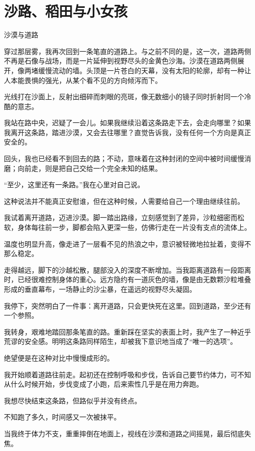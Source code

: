 \chapter{沙路、稻田与小女孩}

沙漠与道路

穿过那层雾，我再次回到一条笔直的道路上。与之前不同的是，这一次，道路两侧不再是石像与战场，而是一片延伸到视野尽头的金黄色沙海。沙漠在道路两侧展开，像两堵缓慢流动的墙。头顶是一片苍白的天幕，没有太阳的轮廓，却有一种让人本能畏惧的强光，从某个看不见的方向倾泻而下。

光线打在沙面上，反射出细碎而刺眼的亮斑，像无数细小的镜子同时折射同一个冷酷的意志。

我站在路中央，迟疑了一会儿。如果我继续沿着这条路走下去，会走向哪里？如果我离开这条路，踏进沙漠，又会去往哪里？直觉告诉我，没有任何一个方向是真正安全的。

回头，我也已经看不到回去的路；不动，意味着在这种封闭的空间中被时间缓慢消磨；向前走，则是把自己交给一个完全未知的结果。

“至少，这里还有一条路。”我在心里对自己说。

这种说法并不能真正安慰谁，但在这种时候，人需要给自己一个理由继续往前。

我试着离开道路，迈进沙漠。脚一踏出路缘，立刻感觉到了差异，沙粒细密而松软，身体每往前一步，脚都会陷入更深一些，仿佛行走在一片没有支点的流体上。

温度也明显升高，像走进了一层看不见的热浪之中，意识被轻微地拉扯着，变得不那么稳定。

走得越远，脚下的沙越松散，腿部没入的深度不断增加。当我距离道路有一段距离时，已经很难控制身体的重心。远方隐约有一道灰色的墙，像是由无数颗沙粒堆叠形成的垂直幕布，一场静止的沙尘暴，在遥远的视野尽头凝固。

我停下，突然明白了一件事：离开道路，只会更快死在这里。回到道路，至少还有一个参照。

我转身，艰难地踏回那条笔直的路。重新踩在坚实的表面上时，我产生了一种近乎荒谬的安全感。明明这条路同样陌生，却被我下意识地当成了“唯一的选项”。

绝望便是在这种对比中慢慢成形的。

我开始顺着道路往前走。起初还在控制呼吸和步伐，告诉自己要节约体力，可不知从什么时候开始，步伐变成了小跑，后来索性几乎是在用力奔跑。

我想尽快结束这条路，但路似乎并没有终点。

不知跑了多久，时间感又一次被抹平。

当我终于体力不支，重重摔倒在地面上，视线在沙漠和道路之间摇晃，最后彻底失焦。

